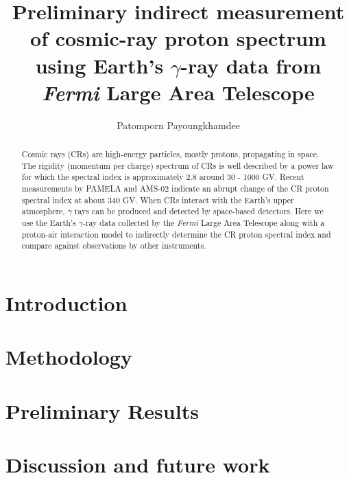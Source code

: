 \documentclass[a4paper]{jpconf}
\begin{document}
\title{Preliminary indirect measurement of cosmic-ray proton spectrum using Earth's $\gamma$-ray data from {\it Fermi} Large Area Telescope}

\author{Patomporn Payoungkhamdee}
\address{Department of Physics, Faculty of Science, Mahidol University}


\begin{abstract}
Cosmic rays (CRs) are high-energy particles, mostly protons, propagating in space. The rigidity (momentum per charge) spectrum of CRs is well described by a power law for which the spectral index is approximately 2.8 around 30 - 1000 GV. Recent measurements by PAMELA and AMS-02 indicate an abrupt change of the CR proton spectral index at about 340 GV. When CRs interact with the Earth's upper atmosphere, $\gamma$ rays can be produced and detected by space-based detectors. Here we use the Earth's $\gamma$-ray data collected by the {\it Fermi} Large Area Telescope along with a proton-air interaction model to indirectly determine the CR proton spectral index and compare against observations by other instruments.
\end{abstract}

\section{Introduction}


\section{Methodology}


\section{Preliminary Results}


\section{Discussion and future work}





\end{document}
